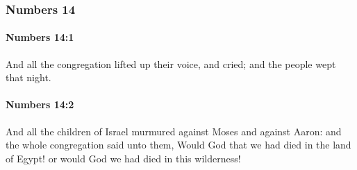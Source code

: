 	\subsubsection{Numbers 14} %
		\label{NUMBERS-14}

		\paragraph{Numbers 14:1} %
			\label{NUMBERS-14-1}

			And all the congregation lifted up their voice, and cried; and the people wept that night.


		\paragraph{Numbers 14:2} %
			\label{NUMBERS-14-2}

			And all the children of Israel murmured against Moses and against Aaron: and the whole congregation said unto them, Would God that we had died in the land of Egypt! or would God we had died in this wilderness!

